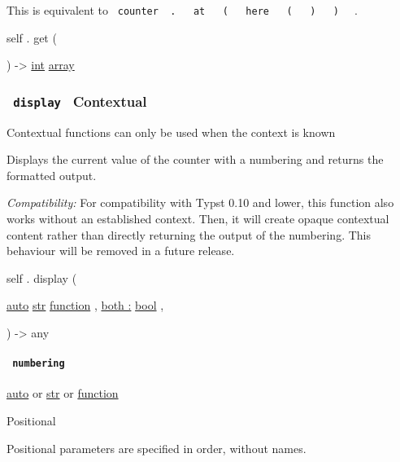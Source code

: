 This is equivalent to
\texttt{\ counter\ }{\texttt{\ .\ }}\texttt{\ }{\texttt{\ at\ }}\texttt{\ }{\texttt{\ (\ }}\texttt{\ }{\texttt{\ here\ }}\texttt{\ }{\texttt{\ (\ }}\texttt{\ }{\texttt{\ )\ }}\texttt{\ }{\texttt{\ )\ }}\texttt{\ }
.

self { . } { get } (

) -\textgreater{} \href{/docs/reference/foundations/int/}{int}
\href{/docs/reference/foundations/array/}{array}

\subsubsection{\texorpdfstring{\texttt{\ display\ } {{ Contextual
}}}{ display   Contextual }}\label{definitions-display}

\label{definitions-display-contextual-tooltip}
Contextual functions can only be used when the context is known

Displays the current value of the counter with a numbering and returns
the formatted output.

\emph{Compatibility:} For compatibility with Typst 0.10 and lower, this
function also works without an established context. Then, it will create
opaque contextual content rather than directly returning the output of
the numbering. This behaviour will be removed in a future release.

self { . } { display } (

{ \href{/docs/reference/foundations/auto/}{auto}
\href{/docs/reference/foundations/str/}{str}
\href{/docs/reference/foundations/function/}{function} , } {
\hyperref[definitions-display-parameters-both]{both :}
\href{/docs/reference/foundations/bool/}{bool} , }

) -\textgreater{} { any }

\paragraph{\texorpdfstring{\texttt{\ numbering\ }}{ numbering }}\label{definitions-display-numbering}

\href{/docs/reference/foundations/auto/}{auto} {or}
\href{/docs/reference/foundations/str/}{str} {or}
\href{/docs/reference/foundations/function/}{function}

{{ Positional }}

\label{definitions-display-numbering-positional-tooltip}
Positional parameters are specified in order, without names.

